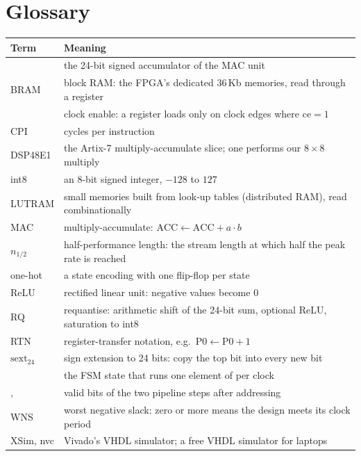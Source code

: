 \section{Glossary}\label{sec:glossary}

\begin{center}\small
\begin{tabularx}{\linewidth}{@{}l L@{}}
\toprule
Term & Meaning \\
\midrule
{} & the 24-bit signed accumulator of the MAC unit \\
BRAM & block RAM: the FPGA's dedicated 36\,Kb memories, read through a register \\
 & clock enable: a register loads only on clock edges where $\mathrm{ce} = 1$ \\
CPI & cycles per instruction \\
DSP48E1 & the Artix-7 multiply-accumulate slice; one performs our 8\,$\times$\,8 multiply \\
int8 & an 8-bit signed integer, $-128$ to $127$ \\
LUTRAM & small memories built from look-up tables (distributed RAM), read combinationally \\
MAC & multiply-accumulate: $\mathrm{ACC} \gets \mathrm{ACC} + a \cdot b$ \\
$n_{1/2}$ & half-performance length: the stream length at which half the peak rate is reached \\
one-hot & a state encoding with one flip-flop per state \\
ReLU & rectified linear unit: negative values become 0 \\
RQ & requantise: arithmetic shift of the 24-bit sum, optional ReLU, saturation to int8 \\
RTN & register-transfer notation, e.g.\ $\mathrm{P0} \gets \mathrm{P0} + 1$ \\
$\mathrm{sext}_{24}$ & sign extension to 24 bits: copy the top bit into every new bit \\
 & the FSM state that runs one element of  per clock \\
,  & valid bits of the two pipeline steps after addressing \\
WNS & worst negative slack: zero or more means the design meets its clock period \\
XSim, nvc & Vivado's VHDL simulator; a free VHDL simulator for laptops \\
\bottomrule
\end{tabularx}
\end{center}
